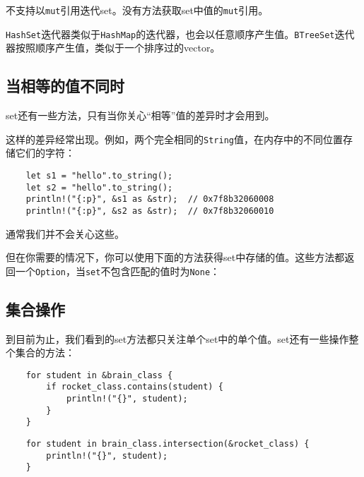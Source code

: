 不支持以\texttt{mut}引用迭代set。没有方法获取set中值的\texttt{mut}引用。


\texttt{HashSet}迭代器类似于\texttt{HashMap}的迭代器，也会以任意顺序产生值。\texttt{BTreeSet}迭代器按照顺序产生值，类似于一个排序过的vector。

\subsection{当相等的值不同时}
set还有一些方法，只有当你关心“相等”值的差异时才会用到。

这样的差异经常出现。例如，两个完全相同的\texttt{String}值，在内存中的不同位置存储它们的字符：

\begin{verbatim}
    let s1 = "hello".to_string();
    let s2 = "hello".to_string();
    println!("{:p}", &s1 as &str);  // 0x7f8b32060008
    println!("{:p}", &s2 as &str);  // 0x7f8b32060010
\end{verbatim}

通常我们并不会关心这些。

但在你需要的情况下，你可以使用下面的方法获得set中存储的值。这些方法都返回一个\texttt{Option}，当\texttt{set}不包含匹配的值时为\texttt{None}：




\subsection{集合操作}
到目前为止，我们看到的set方法都只关注单个set中的单个值。set还有一些操作整个集合的方法：


\begin{verbatim}
    for student in &brain_class {
        if rocket_class.contains(student) {
            println!("{}", student);
        }
    }
\end{verbatim}
\begin{verbatim}
    for student in brain_class.intersection(&rocket_class) {
        println!("{}", student);
    }
\end{verbatim}

